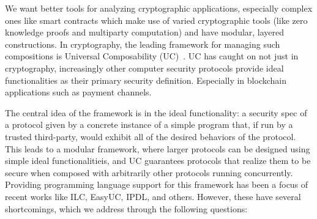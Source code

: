 We want better tools for analyzing cryptographic applications, especially complex ones like smart contracts which make use of varied cryptographic tools (like zero knowledge proofs and multiparty computation) and have modular, layered constructions.
In cryptography, the leading framework for managing such compositions is Universal Composability (UC)~\cite{uc}.
UC has caught on not just in cryptography, increasingly other computer security protocols provide ideal functionalities as their primary security definition.
Especially in blockchain applications such as payment channels.

The central idea of the framework is in the ideal functionality: a security spec of a protocol given by a concrete instance of a simple program that, if run by a trusted third-party, would exhibit all of the desired behaviors of the protocol.
This leads to a modular framework, where larger protocols can be designed using simple ideal functionalitieis, and UC guarantees protocols that realize them to be secure when composed with arbitrarily other protocols running concurrently.
Providing programming language support for this framework has been a focus of recent works like ILC, EasyUC, IPDL, and others. However, these have several shortcomings, which we address through the following questions:

